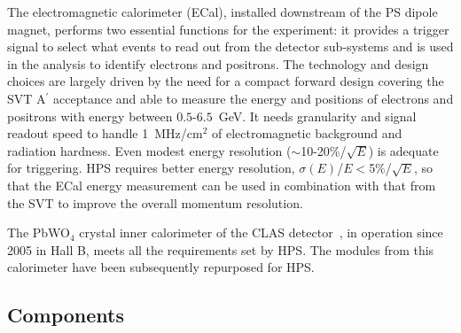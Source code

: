 \documentclass[final,3p,times,twocolumn]{elsarticle}
\newcommand{\Aprime}{A\ensuremath{^\prime}}
\begin{document}
The electromagnetic calorimeter (ECal), installed downstream of the PS dipole magnet, performs two 
essential functions for the experiment: it provides a trigger signal to select what events to read out from 
the detector sub-systems and is used in the analysis to identify electrons and positrons. 
The technology and design choices are largely driven by the need for a compact forward design 
covering the SVT \Aprime{} 
acceptance and able to measure the energy and positions of electrons and positrons with energy between
$0.5$-$6.5$~GeV. It needs granularity and signal 
readout speed to handle 1~MHz/cm$^{2}$ of electromagnetic background and radiation hardness. 
Even modest energy resolution ($\sim$10-20\%/$\sqrt{E}$) is adequate for triggering. HPS requires better 
energy resolution, $\sigma(E)$/$E$$<$5\%/$\sqrt{E}$, so that the ECal energy measurement can be used in 
combination with that from the SVT to improve the overall momentum resolution.

The PbWO$_{4}$ crystal inner calorimeter of the CLAS detector~\cite{clas_ecal,clas_ecal2,clas_thesis}, in 
operation since 2005 in Hall B, meets all the requirements set by HPS. The modules from this calorimeter have been subsequently 
repurposed for HPS. 


\subsection{Components}
\end{document}
